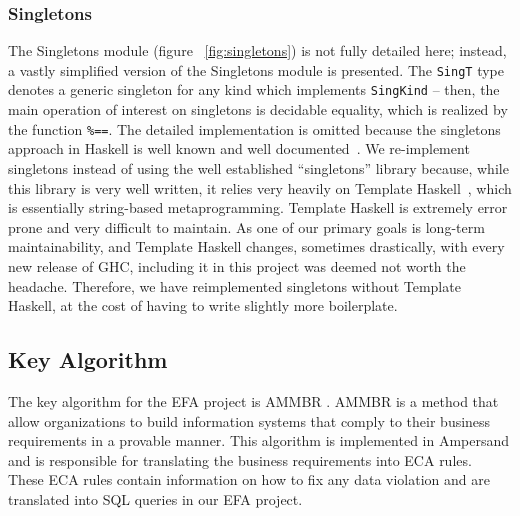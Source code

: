 \documentclass[12pt, svgnames]{article}
\let\Oldsubsection\subsection
\renewcommand{\subsection}{\FloatBarrier\Oldsubsection}
\let\Oldsubsubsection\subsubsection
\renewcommand{\subsubsection}{\FloatBarrier\Oldsubsubsection}
\begin{document}
\Oldsubsubsection{Singletons}\label{subsec:Singletons}

The Singletons module (figure ~\ref{fig:singletons}) is not fully detailed here;
instead, a vastly simplified version of the Singletons module is presented. The
\lstinline{SingT} type denotes a generic singleton for any kind which implements
\lstinline{SingKind} -- then, the main operation of interest on singletons is
decidable equality, which is realized by the function \lstinline{%==}. The
  detailed implementation is omitted because the singletons approach in Haskell
  is well known and well documented~\cite{singletons}. We re-implement
  singletons instead of using the well established ``singletons'' library
  because, while this library is very well written, it relies very heavily on
  Template Haskell~\cite{th}, which is essentially string-based
  metaprogramming. Template Haskell is extremely error prone and very difficult
  to maintain. As one of our primary goals is long-term maintainability, and
  Template Haskell changes, sometimes drastically, with every new release of
  GHC, including it in this project was deemed not worth the
  headache. Therefore, we have reimplemented singletons without Template
  Haskell, at the cost of having to write slightly more boilerplate.


\subsection{Key Algorithm}
The key algorithm for the EFA project is AMMBR \cite{AMMBR}. AMMBR is a method 
that allow organizations to build information systems that comply to their 
business requirements in a provable manner. This algorithm is implemented in 
Ampersand and is responsible for translating the business requirements into ECA 
rules. These ECA rules contain information on how to fix any data violation and 
are translated into SQL queries in our EFA project.
\end{document}
